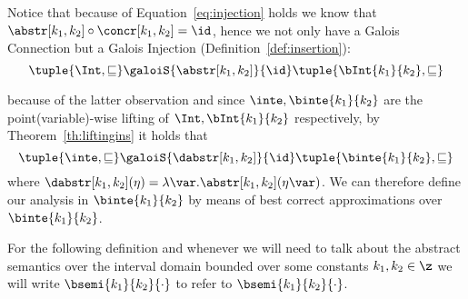 Notice that because of Equation~\eqref{eq:injection} holds we know
that \(\abstr[k_1,k_2] \circ\concr[k_1,k_2] = \id\), hence we not only
have a Galois Connection but a Galois Injection
(Definition~\ref{def:insertion}):
\begin{equation}
  \tuple{\Int, \sqsubseteq} \galoiS{\abstr[k_1, k_2]}{\id} \tuple{\bInt{k_1}{k_2}, \sqsubseteq}
\end{equation}

because of the latter observation and since
\(\inte, \binte{k_1}{k_2}\) are the point(variable)-wise lifting of
\(\Int, \bInt{k_1}{k_2}\) respectively, by Theorem~\ref{th:liftingins}
it holds that
\begin{equation}\label{eq:inteinsert}
  \tuple{\inte, \sqsubseteq} \galoiS{\dabstr[k_1,k_2]}{\id} \tuple{\binte{k_1}{k_2}, \sqsubseteq}
\end{equation}
where
\({\dabstr[k_1,k_2]}(\eta) = \lambda \var
. \abstr[k_1,k_2](\eta\var)\).
We can therefore define our analysis in \(\binte{k_1}{k_2}\) by means
of best correct approximations over \(\binte{k_1}{k_2}\).

\begin{notation}
  For the following definition and whenever we will need to talk about
  the abstract semantics over the interval domain bounded over some
  constants \(k_1, k_2 \in \z\) we will write
  \(\bsemi{k_1}{k_2}{\cdot}\) to refer to
  \(\bsemi{k_1}{k_2}{\cdot}\).
\end{notation}

